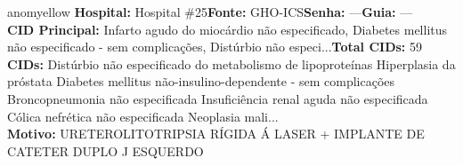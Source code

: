 \documentclass[a4paper,10pt]{article}
\begin{document}
\begin{anomalycard}[Interna\c{c}\~{a}o \#343 | Pac. \#409 | MODERADO (z=2.64) | LOS: 5d | 25/02/2026\,$\to$\,02/03/2026]{anomyellow}
\textbf{Hospital:} Hospital \#25\quad \textbf{Fonte:} GHO-ICS\quad \textbf{Senha:} ---\quad \textbf{Guia:} ---\\

\textbf{CID Principal:} {\small Infarto agudo do miocárdio não especificado, Diabetes mellitus não especificado - sem complicações, Distúrbio não especi...}\quad\textbf{Total CIDs:} 59\\

\textbf{CIDs:} {\scriptsize Distúrbio não especificado do metabolismo de lipoproteínas \textbar{} Hiperplasia da próstata \textbar{} Diabetes mellitus não-insulino-dependente - sem complicações \textbar{} Broncopneumonia não especificada \textbar{} Insuficiência renal aguda não especificada \textbar{} Cólica nefrética não especificada \textbar{} Neoplasia mali...}\\

\textbf{Motivo:} {\scriptsize URETEROLITOTRIPSIA RÍGIDA Á LASER + IMPLANTE DE CATETER DUPLO J ESQUERDO}\\

\end{anomalycard}
\end{document}
